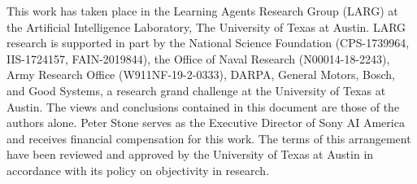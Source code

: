 \documentclass[nohyperref]{article}
\theoremstyle{plain}
\theoremstyle{definition}
\theoremstyle{remark}
\begin{document}
This work has taken place in the Learning Agents Research
Group (LARG) at the Artificial Intelligence Laboratory, The University
of Texas at Austin.  LARG research is supported in part by the
National Science Foundation (CPS-1739964, IIS-1724157, FAIN-2019844),
the Office of Naval Research (N00014-18-2243), Army Research Office
(W911NF-19-2-0333), DARPA, General Motors, Bosch, and
Good Systems, a research grand challenge at the University of Texas at
Austin.  The views and conclusions contained in this document are
those of the authors alone.  Peter Stone serves as the Executive
Director of Sony AI America and receives financial compensation for
this work.  The terms of this arrangement have been reviewed and
approved by the University of Texas at Austin in accordance with its
policy on objectivity in research.






\newpage
\appendix


\end{document}
